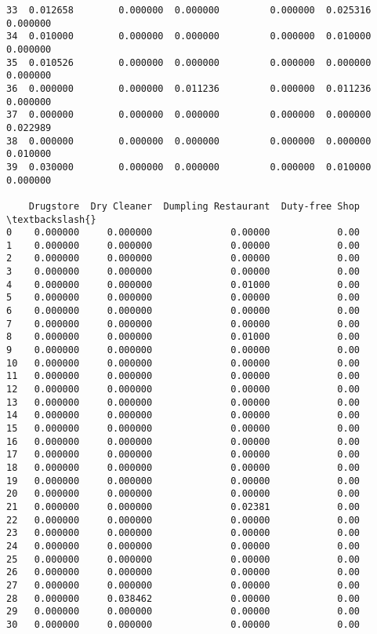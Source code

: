 \documentclass[11pt]{article}
\begin{document}
\begin{tcolorbox}[breakable, size=fbox, boxrule=.5pt, pad at break*=1mm, opacityfill=0]
\begin{Verbatim}[commandchars=\\\{\}]
33  0.012658        0.000000  0.000000         0.000000  0.025316    0.000000
34  0.010000        0.000000  0.000000         0.000000  0.010000    0.000000
35  0.010526        0.000000  0.000000         0.000000  0.000000    0.000000
36  0.000000        0.000000  0.011236         0.000000  0.011236    0.000000
37  0.000000        0.000000  0.000000         0.000000  0.000000    0.022989
38  0.000000        0.000000  0.000000         0.000000  0.000000    0.010000
39  0.030000        0.000000  0.000000         0.000000  0.010000    0.000000

    Drugstore  Dry Cleaner  Dumpling Restaurant  Duty-free Shop  \textbackslash{}
0    0.000000     0.000000              0.00000            0.00
1    0.000000     0.000000              0.00000            0.00
2    0.000000     0.000000              0.00000            0.00
3    0.000000     0.000000              0.00000            0.00
4    0.000000     0.000000              0.01000            0.00
5    0.000000     0.000000              0.00000            0.00
6    0.000000     0.000000              0.00000            0.00
7    0.000000     0.000000              0.00000            0.00
8    0.000000     0.000000              0.01000            0.00
9    0.000000     0.000000              0.00000            0.00
10   0.000000     0.000000              0.00000            0.00
11   0.000000     0.000000              0.00000            0.00
12   0.000000     0.000000              0.00000            0.00
13   0.000000     0.000000              0.00000            0.00
14   0.000000     0.000000              0.00000            0.00
15   0.000000     0.000000              0.00000            0.00
16   0.000000     0.000000              0.00000            0.00
17   0.000000     0.000000              0.00000            0.00
18   0.000000     0.000000              0.00000            0.00
19   0.000000     0.000000              0.00000            0.00
20   0.000000     0.000000              0.00000            0.00
21   0.000000     0.000000              0.02381            0.00
22   0.000000     0.000000              0.00000            0.00
23   0.000000     0.000000              0.00000            0.00
24   0.000000     0.000000              0.00000            0.00
25   0.000000     0.000000              0.00000            0.00
26   0.000000     0.000000              0.00000            0.00
27   0.000000     0.000000              0.00000            0.00
28   0.000000     0.038462              0.00000            0.00
29   0.000000     0.000000              0.00000            0.00
30   0.000000     0.000000              0.00000            0.00

\end{Verbatim}
\end{tcolorbox}
\end{document}
